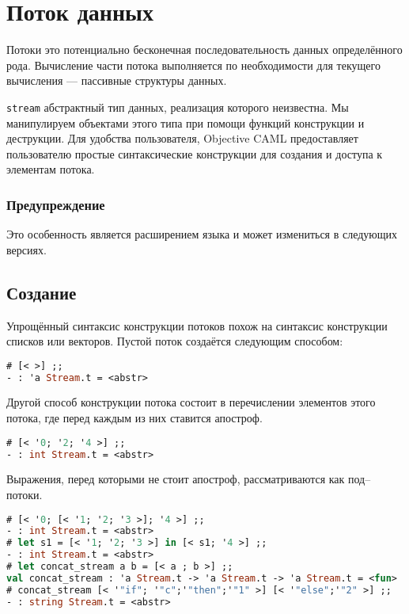 \section{Поток данных}
\label{sec:streams_of_data}

Потоки это потенциально бесконечная последовательность данных определённого
рода. Вычисление части потока выполняется по необходимости для текущего
вычисления --- пассивные структуры данных.

\texttt{stream} абстрактный тип данных, реализация которого неизвестна. Мы
манипулируем объектами этого типа при помощи функций конструкции и деструкции.
Для удобства пользователя, Objective CAML предоставляет пользователю простые
синтаксические конструкции для создания и доступа к элементам потока.

\subsubsection{Предупреждение}

Это особенность является расширением языка и может измениться в следующих
версиях.

\subsection{Создание}
\label{subsec:construction}

Упрощённый синтаксис конструкции потоков похож на синтаксис конструкции списков
или векторов. Пустой поток создаётся следующим способом:

\begin{lstlisting}[language=OCaml]
# [< >] ;;
- : 'a Stream.t = <abstr>
\end{lstlisting}

Другой способ конструкции потока состоит в перечислении элементов этого потока,
где перед каждым из них ставится апостроф.

\begin{lstlisting}[language=OCaml]
# [< '0; '2; '4 >] ;;
- : int Stream.t = <abstr>
\end{lstlisting}

Выражения, перед которыми не стоит апостроф, рассматриваются как под--потоки.

\begin{lstlisting}[language=OCaml]
# [< '0; [< '1; '2; '3 >]; '4 >] ;;
- : int Stream.t = <abstr>
# let s1 = [< '1; '2; '3 >] in [< s1; '4 >] ;;
- : int Stream.t = <abstr>
# let concat_stream a b = [< a ; b >] ;;
val concat_stream : 'a Stream.t -> 'a Stream.t -> 'a Stream.t = <fun>
# concat_stream [< '"if"; '"c";'"then";'"1" >] [< '"else";'"2" >] ;;
- : string Stream.t = <abstr>
\end{lstlisting}

